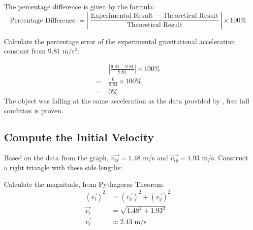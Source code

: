 \documentclass{article}
\begin{document}
\newpage

The percentage difference is given by the formula:
\[
\text{Percentage Difference }=\left|\frac{\text{Experimental Result }-\text{ Theoretical Result}}{\text{Theoretical Result}}\right|\times 100\%
\]

Calculate the percentage error of the experimental gravitational acceleration constant from $9.81$ m/s$^2$:

\begin{align*}
    &\left|\frac{9.81-9.81}{9.81}\right|\times 100\%\\
    =\ &\frac{0}{9.81}\times 100\%\\
    =\ &0\%
\end{align*}
The object was falling at the same acceleration as the data provided by \cite{clay2004pendulum}, free fall condition is proven.



\subsection{Compute the Initial Velocity}
Based on the data from the graph, $\Vec{v_{ix}}=1.48$ m/s and $\Vec{v_{iy}}=1.93$ m/s. Construct a right triangle with these side lengths:

\begin{center}
\end{center}


Calculate the magnitude, from Pythagoras Theorem:
\begin{align*}
    \left(\Vec{v_i}\right)^2&=\left(\Vec{v_x}\right)^2+\left(\Vec{v_y}\right)^2\\
    \Vec{v_i}&=\sqrt{1.48^2+1.93^2}\\
    \Vec{v_i}&\approx 2.43\text{ m/s}
\end{align*}
\end{document}

